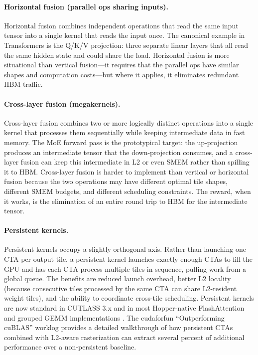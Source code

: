\documentclass[10pt]{article}
\begin{document}
\paragraph{Horizontal fusion (parallel ops sharing inputs).}
Horizontal fusion combines independent operations that read the same input tensor into a single kernel that reads the input once. The canonical example in Transformers is the Q/K/V projection: three separate linear layers that all read the same hidden state and could share the load. Horizontal fusion is more situational than vertical fusion---it requires that the parallel ops have similar shapes and computation costs---but where it applies, it eliminates redundant HBM traffic.

\paragraph{Cross-layer fusion (megakernels).}
Cross-layer fusion combines two or more logically distinct operations into a single kernel that processes them sequentially while keeping intermediate data in fast memory. The MoE forward pass is the prototypical target: the up-projection produces an intermediate tensor that the down-projection consumes, and a cross-layer fusion can keep this intermediate in L2 or even SMEM rather than spilling it to HBM. Cross-layer fusion is harder to implement than vertical or horizontal fusion because the two operations may have different optimal tile shapes, different SMEM budgets, and different scheduling constraints. The reward, when it works, is the elimination of an entire round trip to HBM for the intermediate tensor.

\paragraph{Persistent kernels.}
Persistent kernels occupy a slightly orthogonal axis. Rather than launching one CTA per output tile, a persistent kernel launches exactly enough CTAs to fill the GPU and has each CTA process multiple tiles in sequence, pulling work from a global queue. The benefits are reduced launch overhead, better L2 locality (because consecutive tiles processed by the same CTA can share L2-resident weight tiles), and the ability to coordinate cross-tile scheduling. Persistent kernels are now standard in CUTLASS 3.x and in most Hopper-native FlashAttention and grouped GEMM implementations \citep{shah2024flashattention3,thakkar2023cutlass}. The cudaforfun ``Outperforming cuBLAS'' worklog \citep{cudaforfun2024} provides a detailed walkthrough of how persistent CTAs combined with L2-aware rasterization can extract several percent of additional performance over a non-persistent baseline.
\end{document}
